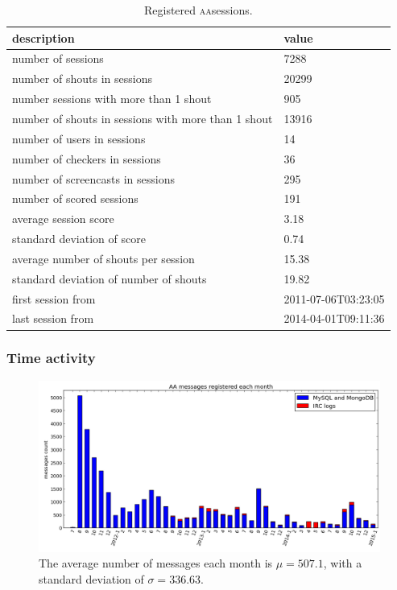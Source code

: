 \documentclass[a4paper, 11pt]{article} %
\newcommand{\aab}{\textsc{aa}}
\begin{document}
\begin{table}[!h]
  \centering
  \caption{Registered \aab sessions.}\label{tab:session}
  \begin{tabular}{|l|l|}\hline
      {\bf description} & {\bf value}   \\\hline\hline
      number of sessions & 7288 \\ \hline
      number of shouts in sessions & 20299 \\ \hline
      number sessions with more than 1 shout & 905 \\ \hline
      number of shouts in sessions with more than 1 shout & 13916 \\ \hline
      number of users in sessions & 14 \\ \hline
      number of checkers in sessions & 36 \\ \hline
      number of screencasts in sessions & 295 \\ \hline
      number of scored sessions & 191 \\ \hline
      average session score & 3.18 \\ \hline
      standard deviation of score & 0.74 \\ \hline
      average number of shouts per session & 15.38 \\ \hline
      standard deviation of number of shouts & 19.82 \\ \hline
      first session from & 2011-07-06T03:23:05 \\ \hline
      last session from & 2014-04-01T09:11:36 \\ \hline

  \end{tabular}
\end{table}


\subsubsection{Time activity}
\begin{figure}[H]
    \hspace{-25mm}
    \includegraphics[width=1.3\textwidth]{imgs/actHist}
  \caption{\small The average number of messages each month is $\mu=507.1$, with a standard deviation of $\sigma=336.63 $.}\label{fig:telao2}
\end{figure}
\end{document}

